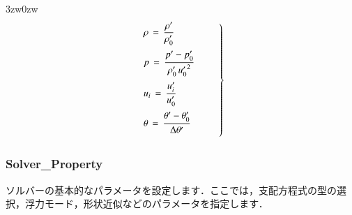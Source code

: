\begin{indentation}{3zw}{0zw}
\begin{equation}
\left.
\begin{array}{l}
\vspace{2mm}
\displaystyle{ \rho \,=\, \frac{\rho^{\prime}}{\rho_{0}^{\prime}} } \\
\vspace{2mm}
\displaystyle{ p \,=\, \frac{p^{\prime}-p_{0}^{\prime}}{\rho_{0}^{\prime}\,{u_{0}^{\prime}}^{2}} } \\
\vspace{2mm}
\displaystyle{ u_{i} \,=\, \frac{u_{i}^{\prime}}{u_0^{\prime}} } \\
\vspace{2mm}
\displaystyle{ \theta \,=\, \frac{\theta^{\prime}-\theta_{0}^{\prime}}{\Delta \theta^{\prime}} } 
\end{array} \qquad \right \}
\end{equation}

\end{indentation}



\pagebreak
\subsubsection{Solver\_Property}

ソルバーの\hypertarget{tgt:solver_property}{基本的なパラメータ}を設定します．ここでは，支配方程式の型の選択，浮力モード，形状近似などのパラメータを指定します．


